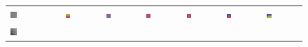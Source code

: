 \begin{figure}[h!]
	\setlength\tabcolsep{1pt}
	\def\arraystretch{0.5}
	\begin{tabular}{C{0.14\textwidth}C{0.14\textwidth}C{0.14\textwidth}C{0.14\textwidth}C{0.14\textwidth}C{0.14\textwidth}C{0.14\textwidth}}
		\includegraphics[width=0.14\textwidth]{images/p03/p03_01.png} &
		\includegraphics[width=0.14\textwidth]{images/gen/filter_size/p03_01.png_0.25.png} &
		\includegraphics[width=0.14\textwidth]{images/gen/filter_size/p03_01.png_0.50.png} &
		\includegraphics[width=0.14\textwidth]{images/gen/filter_size/p03_01.png_0.75.png} &
		\includegraphics[width=0.14\textwidth]{images/gen/filter_size/p03_01.png_1.00.png} &
		\includegraphics[width=0.14\textwidth]{images/gen/filter_size/p03_01.png_1.25.png} &
		\includegraphics[width=0.14\textwidth]{images/gen/filter_size/p03_01.png_1.50.png} \\
		\includegraphics[width=0.14\textwidth]{images/p03/p03_02.png} &

\end{tabular}
\end{figure}
